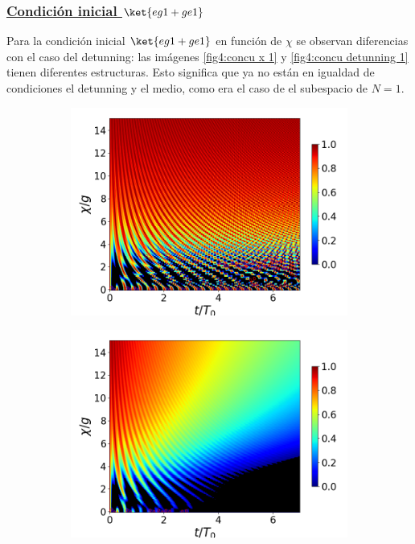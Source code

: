 \subsubsection{\underline{Condición inicial $\ket{eg1+ge1}$}}
Para la condición inicial $\ket{eg1+ge1}$ en función de $\chi$ se observan diferencias con el caso del detunning: las imágenes \ref{fig4:concu x 1} y \ref{fig4:concu detunning 1} tienen diferentes estructuras. Esto significa que ya no están en igualdad de condiciones el detunning y el medio, como era el caso de el subespacio de $N=1$.
\begin{figure}[h!]
    \centering
    \begin{subfigure}{0.49\textwidth}
        \includegraphics[width=\textwidth]{figuras/ch4/concu/chi/eg1+ge1 d=0.0g k=0.0g J=0.0g gamma=0.25g concu chi uni.png}
        \caption{}
        \label{fig4:concu x 1 uni}
    \end{subfigure}
    \hfill
    \begin{subfigure}{0.49\textwidth}
        \includegraphics[width=\textwidth]{figuras/ch4/concu/chi/eg1+ge1 d=0.0g k=0.0g J=0.0g gamma=0.25g concu chi dis.png}

\end{subfigure}
\end{figure}
